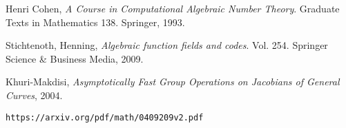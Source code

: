 \documentclass{article}
\begin{document}
\begin{thebibliography}{9}

 Henri Cohen, {\it A Course in Computational
  Algebraic Number Theory}. Graduate Texts in Mathematics
  138. Springer, 1993.

 Stichtenoth, Henning, {\it Algebraic
  function fields and codes}.  Vol. 254. Springer Science \& Business
  Media, 2009.

 Khuri-Makdisi,
{\it Asymptotically Fast Group Operations on
Jacobians of General Curves}, 2004.

{\tt https://arxiv.org/pdf/math/0409209v2.pdf}

\end{thebibliography}
\end{document}
